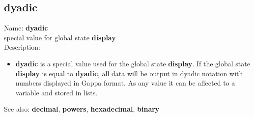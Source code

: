 \subsection{ dyadic }
\noindent Name: \textbf{dyadic}\\
special value for global state \textbf{display}\\

\noindent Description: \begin{itemize}

\item \textbf{dyadic} is a special value used for the global state \textbf{display}.
   If the global state \textbf{display} is equal to \textbf{dyadic}, all data will
   be output in dyadic notation with numbers displayed in Gappa format.
   As any value it can be affected to a variable and stored in lists.
\end{itemize}
See also: \textbf{decimal}, \textbf{powers}, \textbf{hexadecimal}, \textbf{binary}
